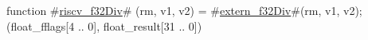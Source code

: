 function #\hyperref[sailRISCVzriscvzyf32Div]{riscv\_f32Div}# (rm, v1, v2) = {
  #\hyperref[sailRISCVzexternzyf32Div]{extern\_f32Div}#(rm, v1, v2);
  (float_fflags[4 .. 0], float_result[31 .. 0])
}
